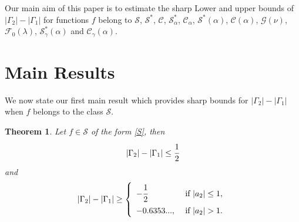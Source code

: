 \documentclass[a4paper,12pt]{amsart}
\newtheorem{theorem}{Theorem}[section]
\theoremstyle{definition}
\numberwithin{equation}{section}
\begin{document}
\medskip

Our main aim of this paper is to estimate the sharp Lower and upper  bounds of  $|\Gamma_2|-|\Gamma_1|$ for functions $f$ belong to $\mathcal{S}$, $\mathcal{S}^*$, $\mathcal{C}$, $\mathcal{S}^*_{\alpha}$, $\mathcal{C}_{\alpha}$, $\mathcal{S}^*(\alpha)$, $\mathcal{C}(\alpha)$, $\mathcal{G}(\nu)$,  $\mathcal{F}_0(\lambda)$,  $\mathcal{S}^*_{\gamma}(\alpha)$ and $\mathcal{C}_{\gamma}(\alpha)$. 


\medskip


 \section{Main Results}
 We now state our first main result which provides sharp bounds for $|\Gamma_2|-|\Gamma_1|$ when $f$ belongs to the class $\mathcal{S}$.
 \begin{theorem}\label{classS}
 Let $f \in \mathcal{S}$ of the form \eqref{S}, then 
 $$
 |\Gamma_2|-|\Gamma_1| \leq \cfrac{1}{2}
 $$
 and 
 \begin{equation*}\label{BBB}
|\Gamma_2|-|\Gamma_1| \geq \left \{
	\begin{array}{ll}
		-\cfrac{1}{2} & {\mbox{ if }} |a_2|\leq 1,
		\\[3mm]
		-0.6353..., & {\mbox{ if }} |a_2|>1.
	\end{array}
	\right.
\end{equation*}
 \end{theorem}
\end{document}
